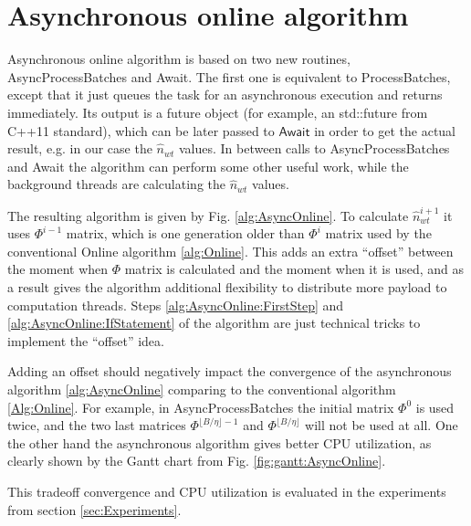 \documentclass[russian,english]{llncs}
\newcommand{\kw}[1]{\textsf{#1}}
\begin{document}
\section{Asynchronous online algorithm}
\label{sec:AsyncOnline}

Asynchronous online algorithm is based on two new routines, \kw{AsyncProcessBatches} and \kw{Await}.
The first one is equivalent to \kw{ProcessBatches}, except that it just queues the task for an asynchronous execution and returns immediately.
Its output is a future object (for example, an \kw{std::future} from \kw{C++11} standard),
which can be later passed to $\kw{Await}$ in order to get the actual result, e.g. in our case the $\hat n_{wt}$ values.
In between calls to \kw{AsyncProcessBatches} and \kw{Await} the algorithm
can perform some other useful work, while the background threads are calculating the $\hat n_{wt}$ values.

The resulting algorithm is given by Fig. \ref{alg:AsyncOnline}.
To calculate $\hat n^{i+1}_{wt}$ it uses $\Phi^{i-1}$ matrix,
which is one generation older than $\Phi^{i}$ matrix used by the conventional \kw{Online algorithm} \ref{alg:Online}.
This adds an extra ``offset'' between the moment when $\Phi$ matrix is calculated and the moment when it is used,
and as a result gives the algorithm additional flexibility to distribute more payload to computation threads.
Steps \ref{alg:AsyncOnline:FirstStep} and \ref{alg:AsyncOnline:IfStatement} of the algorithm
are just technical tricks to implement the ``offset'' idea.

Adding an offset should negatively impact the convergence of the asynchronous algorithm \ref{alg:AsyncOnline}
comparing to the conventional algorithm \ref{Alg:Online}.
For example, in \kw{AsyncProcessBatches} the initial matrix $\Phi^0$ is used twice,
and the two last matrices $\Phi^{\lfloor B / \eta \rfloor - 1}$ and $\Phi^{\lfloor B / \eta \rfloor}$ will not be used at all.
One the other hand the asynchronous algorithm gives better CPU utilization,
as clearly shown by the Gantt chart from Fig. \ref{fig:gantt:AsyncOnline}.

This tradeoff convergence and CPU utilization is evaluated in the experiments from section \ref{sec:Experiments}.
\end{document}
